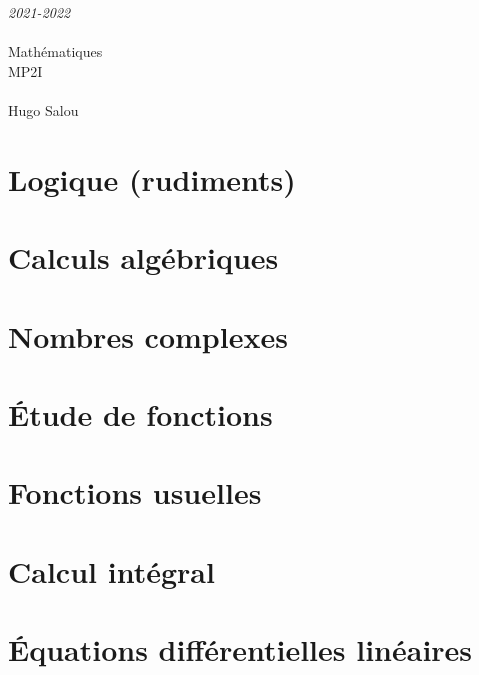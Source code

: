 \documentclass[a4paper]{report}
\newcommand{\chap}[2][0]{
	\setcounter{chapter}{#1 - 1}
	\chapter{#2}
	\renewcommand*\parttitle{#2}
}
\begin{document}
	\begin{titlepage}
		\begin{center}
			\vspace{10cm}
			{\Large \itshape 2021-2022}\\
			\vspace{3cm}
			\\
			\vspace{2mm}
			\vspace{0.5cm}
			{\HUGE Mathématiques}\\
			\vspace{0.5cm}
			{\fontsize{240pt}{260pt}\selectfont MP2I}\\
			\vspace{0.5cm}
			\\
			\vfill
			Hugo {\sc Salou}\\
		\end{center}
	\end{titlepage}

	\tableofcontents



	{
		\chap[00]{Logique (rudiments)}
		\renewcommand{\cwd}{../chap00}
		
		
		
		
		
	}

	{
		\chap[01]{Calculs algébriques}
		\renewcommand{\cwd}{../chap01}
		
		
		
		
		
		
	}

	{
		\chap[02]{Nombres complexes}
		\renewcommand{\cwd}{../chap02}
		
		
		
		
		
	}

	{
		\chap[03]{Étude de fonctions}
		\renewcommand{\cwd}{../chap03}
		
		
		
	}

	{
		\chap[04]{Fonctions usuelles}
		\renewcommand{\cwd}{../chap04}
		
		
		
		
		
		
		
	}

	{
		\chap[05]{Calcul intégral}
		\renewcommand{\cwd}{../chap05}
		
	}

	{
		\chap[06]{Équations différentielles linéaires}
		\renewcommand{\cwd}{../chap06}
		
		
		
	}
\end{document}
